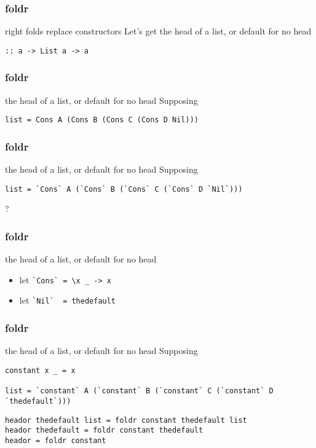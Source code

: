 %

\begin{frame}[fragile]
\frametitle{foldr}
\begin{block}{right folds replace constructors}
Let's get the head of a list, or default for no head

\lstinline{:: a -> List a -> a}
\end{block}
\end{frame}

\begin{frame}[fragile]
\frametitle{foldr}
\begin{block}{the head of a list, or default for no head}
Supposing 
\begin{lstlisting}[style=haskell,basicstyle=\tiny\ttfamily,mathescape]
list = Cons A (Cons B (Cons C (Cons D Nil)))
\end{lstlisting}
\end{block}
\end{frame}

\begin{frame}[fragile]
\frametitle{foldr}
\begin{block}{the head of a list, or default for no head}
Supposing 
\begin{lstlisting}[style=haskell,basicstyle=\tiny\ttfamily,mathescape]
list = `Cons` A (`Cons` B (`Cons` C (`Cons` D `Nil`)))
\end{lstlisting}
\end{block}
\begin{center}
\LARGE
?
\end{center}
\end{frame}

\begin{frame}[fragile]
\frametitle{foldr}
\begin{block}{the head of a list, or default for no head}
\begin{itemize}
\item let \lstinline{`Cons` = \x _ -> x}
\item let \lstinline{`Nil`  = thedefault}
\end{itemize}
\end{block}
\end{frame}

\begin{frame}[fragile]
\frametitle{foldr}
\begin{block}{the head of a list, or default for no head}
Supposing
\begin{lstlisting}[style=haskell,basicstyle=\tiny\ttfamily,mathescape]
constant x _ = x

list = `constant` A (`constant` B (`constant` C (`constant` D `thedefault`)))
\end{lstlisting}
\end{block}
\begin{lstlisting}[style=haskell,basicstyle=\scriptsize\ttfamily,mathescape]
heador thedefault list = foldr constant thedefault list
heador thedefault = foldr constant thedefault
heador = foldr constant
\end{lstlisting}
\end{frame}

